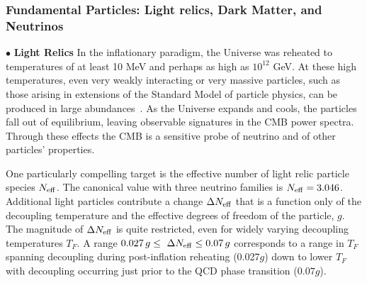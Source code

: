 \documentclass[PICOReport.tex]{subfiles}
\begin{document}
\subsubsection{Fundamental Particles: Light relics, Dark Matter, and Neutrinos}
\label{sec:relics_neutrinos}

$\bullet$ {\bf Light Relics} \hspace{0.1in} In the inflationary paradigm, the Universe was reheated to temperatures of 
at least 10 MeV and perhaps as 
high as $10^{12}$ GeV.  At these high temperatures, even very weakly interacting or very massive particles, 
such as those arising in extensions of the Standard Model of particle physics, can be produced in large 
abundances~\cite{1979ARNPS..29..313S,Bolz:2000fu}.  As the Universe expands and cools, 
the particles fall out of equilibrium, leaving observable signatures in the CMB power spectra.
Through these effects the CMB is a sensitive probe of neutrino and of other particles' properties.  


One particularly compelling target is the effective number of light relic particle species ${N_{\rm eff}}$. The canonical value with three neutrino families is ${N_{\rm eff}} = 3.046$. Additional light particles contribute a change $\Delta {N_{\rm eff}}$ that is a function only of the decoupling temperature and the effective degrees of freedom of the particle, $g$. The magnitude of $\Delta{N_{\rm eff}}$ is quite restricted, even for widely varying decoupling temperatures $T_{F}$. A range $ 0.027\,g \leq \ \Delta {N_{\rm eff}} \leq 0.07\,g$ corresponds to a range in $T_{F}$ spanning decoupling during post-inflation reheating (0.027$g$) down to lower $T_{F}$ with decoupling occurring just prior to the QCD phase transition ($0.07g$).
\end{document}
